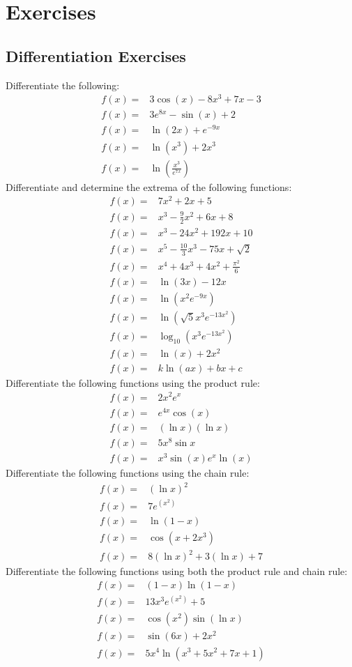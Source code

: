 \documentclass[main.tex]{subfiles}
\begin{document}
\section{Exercises}
\subsection{Differentiation Exercises}
Differentiate the following:
\begin{align}
f(x) =& 3 \cos(x)-8x^3+7x-3\\
f(x) =& 3e^{8x}-\sin(x)+2\\
f(x) =& \ln(2x) + e^{-9x}\\
f(x) =& \ln(x^3)+2x^3\\
f(x) =& \ln\left(\frac{x^3}{e^{7x}}\right)
\end{align}
Differentiate and determine the extrema of the following functions:
\begin{align}
f(x) =& 7x^2+2x+5\\
f(x) =& x^3-\frac{9}{2}x^2+6x+8\\
f(x) =& x^3-24x^2+192x+10\\
f(x) =& x^5-\frac{10}{3}x^3-75x+\sqrt{2}\\
f(x) =& x^4+4x^3+4x^2+\frac{\pi^2}{6}\\
f(x) =& \ln(3x)-12x\\
f(x) =& \ln(x^2e^{-9x})\\
f(x) =& \ln(\sqrt{5}x^3e^{-13x^2})\\
f(x) =& \log_{10}(x^3e^{-13x^2})\\
f(x) =& \ln(x) + 2x^2\\
f(x) =& k\ln(ax) + bx+c
\end{align}
Differentiate the following functions using the product rule:
\begin{align}
f(x) =& 2x^2e^x\\
f(x) =& e^{4x}\cos(x)\\
f(x) =& (\ln{x})(\ln{x})\\
f(x) =& 5x^8\sin{x}\\
f(x) =& x^3\sin{(x)}e^x\ln{(x)}
\end{align}
Differentiate the following functions using the chain rule:
\begin{align}
f(x) =& (\ln{x})^2\\
f(x) =& 7e^{(x^2)}\\
f(x) =& \ln{(1-x)}\\
f(x) =& \cos{(x+2x^3)}\\
f(x) =& 8(\ln{x})^2 + 3 (\ln{x}) + 7
\end{align}
Differentiate the following functions using both the product rule and chain rule:
\begin{align}
f(x) =& (1-x)\ln{(1-x)}\\
f(x) =& 13x^3e^{(x^2)} + 5\\
f(x) =& \cos{(x^2)}\sin{(\ln{x})}\\
f(x) =& \sin{(6x)} + 2x^2\\
f(x) =& 5x^4\ln{(x^3 + 5x^2 + 7x + 1)}
\end{align}
\end{document}
